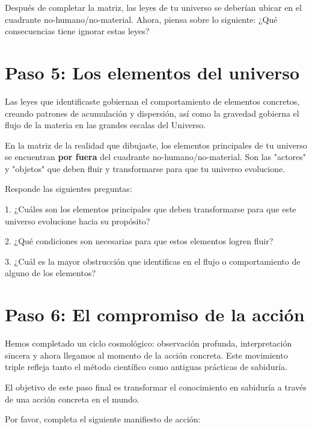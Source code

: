 \documentclass[statementpaper,oneside,article,10pt]{memoir}
\begin{document}
Después de completar la matriz, las leyes de tu universo se deberían ubicar en el cuadrante no-humano/no-material.
Ahora, piensa sobre lo siguiente: ¿Qué consecuencias tiene ignorar estas leyes?
\vspace{2.5cm}


\newpage
\section{Paso 5: Los elementos del universo}
Las leyes que identificaste gobiernan el comportamiento de elementos concretos, creando patrones de acumulación y dispersión, así como la gravedad gobierna el flujo de la materia en las grandes escalas del Universo.

En la matriz de la realidad que dibujaste, los elementos principales de tu universo se encuentran \textbf{por fuera} del cuadrante no-humano/no-material. Son las "actores" y "objetos" que deben fluir y transformarse para que tu universo evolucione.

Responde las siguientes preguntas:

1. ¿Cuáles son los elementos  principales que deben transformarse para que este universo evolucione hacia su propósito?
\vspace{3cm}

2. ¿Qué condiciones son necesarias para que estos elementos logren fluir?
\vspace{3cm}

3. ¿Cuál es la mayor obstrucción que identificas en el flujo o comportamiento de alguno de los elementos?
\vspace{3cm}





\newpage
\section{Paso 6: El compromiso de la acción}
Hemos completado un ciclo cosmológico: observación profunda, interpretación sincera y ahora llegamos al momento de la acción concreta. Este movimiento triple refleja tanto el método científico como antiguas prácticas de sabiduría.

El objetivo de este paso final es transformar el conocimiento en sabiduría a través de una acción concreta en el mundo.

Por favor, completa el siguiente manifiesto de acción:
\end{document}
